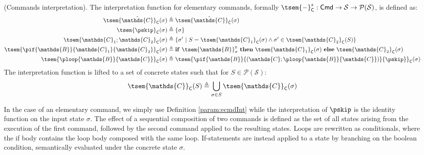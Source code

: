 \begin{defn}
	(Commands interpretation).
	The interpretation function for elementary commands, formally $\tsem{-}^s_{\mathsf{C}} : \mathsf{Cmd} \rightarrow \mathcal{S} \rightarrow \mathcal{P}(\mathcal{S})$, is defined as:
	\begin{align*}
		\tsem{\hat{\mathds{C}}}_{\mathsf{C}}(\sigma) &\triangleq \tsem{\hat{\mathds{C}}}_{\hat{\mathsf{C}}}(\sigma)
		\\
		\tsem{\pskip}_{\mathsf{C}}(\sigma) &\triangleq \{ \sigma \}
		\\
		\tsem{\mathds{C}_1 ; \mathds{C}_2}_{\mathsf{C}}(\sigma) &\triangleq \{ \sigma'\ |\ S = \tsem{\mathds{C}_1}_\mathsf{C}(\sigma) \land \sigma' \in \tsem{\mathds{C}_2}_\mathsf{C}(S) \}
		\\
		\tsem{\pif{\mathds{B}}{\mathds{C}_1}{\mathds{C}_2}}_\mathsf{C}(\sigma) &\triangleq \mathbf{if}\ \tsem{\mathds{B}}^\textsc{b}_{\sigma}\ \mathbf{then}\ \tsem{\mathds{C}_1}_\mathsf{C}(\sigma)\ \mathbf{else}\ \tsem{\mathds{C}_2}_\mathsf{C}(\sigma)
		\\
		\tsem{\ploop{\mathds{B}}{\mathds{C}}}_\mathsf{C}(\sigma) &\triangleq \tsem{\pif{\mathds{B}}{\left(\mathds{C};\ploop{\mathds{B}}{\mathds{C}}\right)}{\pskip}}_\mathsf{C}(\sigma)
	\end{align*}
	The interpretation function is lifted to a set of concrete states such that for $S \in \mathcal{P}(\mathcal{S})$:
	\[
		\tsem{\mathds{C}}_\mathsf{C}(S) \triangleq \bigcup_{\sigma \in S} \tsem{\mathds{C}}_\mathsf{C}(\sigma)
	\]	
\end{defn}
In the case of an elementary command, we simply use Definition \ref{param:ecmdInt} while the interpretation of $\pskip$ is the identity function on the input state $\sigma$. The effect of a sequential composition of two commands is defined as the set of all states arising from the execution of the first command, followed by the second command applied to the resulting states. Loops are rewritten as conditionals, where the if body contains the loop body composed with the same loop. If-statements are instead applied to a state by branching on the boolean condition, semantically evaluated under the concrete state $\sigma$.

